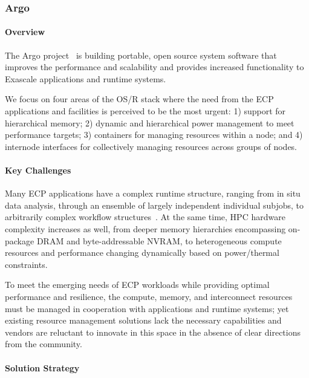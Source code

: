 \subsubsection{ Argo} 

\paragraph{Overview} 

The Argo project~\cite{perarnau2017argo} is building portable, open source system software that improves
the performance and scalability and provides increased functionality to
Exascale applications and runtime systems.

We focus on four areas of the OS/R stack where the need from the ECP
applications and facilities is perceived to be the most urgent:
1) support for hierarchical memory;
2) dynamic and hierarchical power management to meet performance
targets;
3) containers for managing resources within a node; and
4) internode interfaces for collectively managing resources across groups
of nodes.


\paragraph{Key Challenges}

Many ECP applications have a complex runtime structure, ranging from in
situ data analysis, through an ensemble of largely independent individual
subjobs, to arbitrarily complex workflow structures~\cite{dreher2017situ}.  At the same time, HPC
hardware complexity increases as well, from deeper memory hierarchies
encompassing on-package DRAM and byte-addressable NVRAM, to heterogeneous
compute resources and performance changing dynamically based on
power/thermal constraints.

To meet the emerging needs of ECP workloads while providing optimal
performance and resilience, the compute, memory, and interconnect resources
must be managed in cooperation with applications and runtime systems; yet
existing resource management solutions lack the necessary capabilities and
vendors are reluctant to innovate in this space in the absence of clear
directions from the community.


\paragraph{Solution Strategy}

